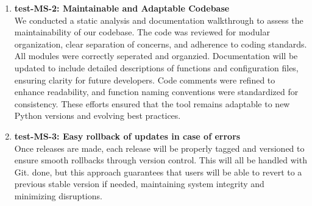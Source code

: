 \documentclass[12pt, titlepage]{article}
\begin{document}
\begin{enumerate}
    The entire process was completed in less than one day, confirming the tool's extensibility target.

  \item \textbf{test-MS-2: Maintainable and Adaptable Codebase} \\[2mm]
    We conducted a static analysis and documentation walkthrough to
    assess the maintainability of our codebase. The code was reviewed
    for modular organization, clear separation
    of concerns, and adherence to coding standards. All modules were
    correctly seperated and organzied. Documentation will be updated
    to include detailed descriptions of functions
    and configuration files, ensuring clarity for future developers.
    Code comments were refined to enhance readability, and function
    naming conventions were standardized for
    consistency. These efforts ensured that the tool remains
    adaptable to new Python versions and evolving best practices.

  \item \textbf{test-MS-3: Easy rollback of updates in case of errors} \\[2mm]
    Once releases are made, each release will be properly tagged and
    versioned to ensure smooth rollbacks through version control.
    This will all be handled with Git. done, but
    this approach guarantees that users will be able to revert to a
    previous stable version if needed, maintaining system integrity
    and minimizing disruptions.
\end{enumerate}
\end{document}
